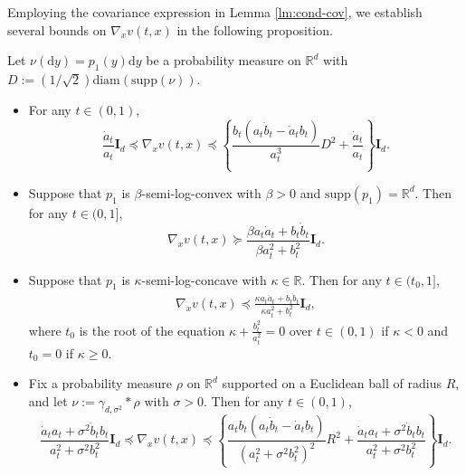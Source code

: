 \documentclass[twoside,11pt]{article}
\def\rmI{{\mathbf{I}}}
\def\sR{{\mathbb{R}}}
\newcommand{\diff}{\mathrm{d}}
\numberwithin{equation}{section}
\begin{document}
Employing the covariance expression in Lemma \ref{lm:cond-cov}, we establish several bounds on $\nabla_x v(t, x)$ in the following proposition.

\begin{proposition} \label{prop:vf-bd}
Let $\nu(\diff y) = p_1(y) \diff y$ be a probability measure on $\sR^d$ with\\
 $D := (1/\sqrt{2}) \mathrm{diam} (\mathrm{supp}(\nu))$.
\begin{itemize}
    \item[(a)] For any $t\in (0,1)$,
    \begin{equation*}
        \frac{\dot{a}_t}{a_t} \rmI_d \preceq \nabla_x v(t, x) \preceq \left\{ \frac{b_t (a_t \dot{b}_t - \dot{a}_t b_t)}{a_t^3} D^2 + \frac{\dot{a}_t} {a_t} \right\} \rmI_d.
    \end{equation*}

    \item[(b)] Suppose that $p_1$ is $\beta$-semi-log-convex with $\beta > 0$ and $\mathrm{supp}(p_1) = \sR^d$. Then for any $t\in (0, 1]$,
    \begin{equation*}
        \nabla_x v(t, x) \succeq \frac{\beta a_t \dot{a}_t + b_t \dot{b}_t} {\beta a_t^2 + b_t^2} \rmI_d.
    \end{equation*}

    \item[(c)] Suppose that $p_1$ is $\kappa$-semi-log-concave with $\kappa \in \sR$. Then for any $t \in (t_0, 1]$,
    \begin{align*}
        \nabla_x v(t, x) \preceq \frac{\kappa a_t \dot{a}_t + b_t \dot{b}_t} {\kappa a_t^2 + b_t^2} \rmI_d,
    \end{align*}
    where $t_0$ is the root of the equation $\kappa + \frac{b_t^2}{a_t^2} = 0$ over $t \in (0, 1)$ if $\kappa < 0$ and $t_0 = 0$ if $\kappa \ge 0$.

    \item[(d)] Fix a probability measure $\rho$ on $\sR^d$ supported on a Euclidean ball of radius $R$, and let $\nu := \gamma_{d, \sigma^2} * \rho$ with $\sigma > 0$. Then for any $t \in (0, 1)$,
    \begin{equation*}
        \frac{\dot{a}_t a_t + \sigma^2 \dot{b}_t b_t}{a_t^2 + \sigma^2 b_t^2} \rmI_d
        \preceq \nabla_x v(t, x) \preceq
        \left\{ \frac{a_t b_t (a_t \dot{b}_t - \dot{a}_t b_t)}{(a_t^2 + \sigma^2 b_t^2)^2} R^2 + \frac{\dot{a}_t a_t + \sigma^2 \dot{b}_t b_t}{a_t^2 + \sigma^2 b_t^2} \right\} \rmI_d.
    \end{equation*}


\end{itemize}
\end{proposition}
\end{document}
